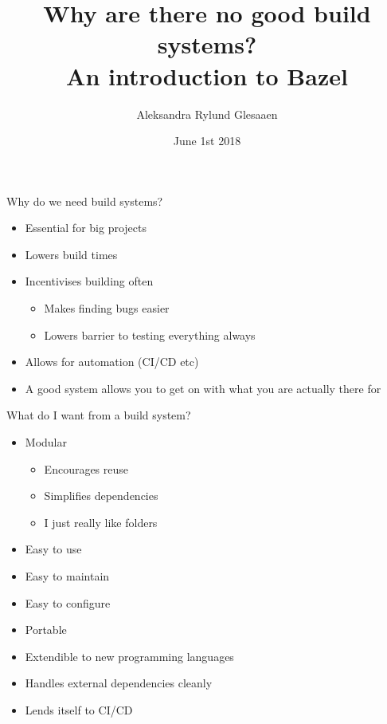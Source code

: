 \documentclass[11pt]{beamer}
\author{Aleksandra Rylund Glesaaen}
\title[%
Why are there no good build systems? An introduction to Bazel]{%
Why are there no good build systems? \\ An introduction to Bazel}
\date{June 1st 2018}
\institute{SA2C Tech Chat}
\begin{document}
\maketitle

\begin{frame}{Why do we need build systems?}

  \begin{itemize} \setlength\itemsep{1em}
    \item Essential for big projects
    \item Lowers build times
    \item Incentivises building often
    \begin{itemize}
      \item Makes finding bugs easier
      \item Lowers barrier to testing everything always
    \end{itemize}
  \item Allows for automation (CI/CD etc)
  \item A good system allows you to get on with what you are actually there for
  \end{itemize}

\end{frame}

\begin{frame}{What do I want from a build system?}

  \begin{itemize}
    \item Modular
      \begin{itemize}
        \item Encourages reuse
        \item Simplifies dependencies
        \item I just really like folders
      \end{itemize}
    \item Easy to use
    \item Easy to maintain
    \item Easy to configure
    \item Portable
    \item Extendible to new programming languages
    \item Handles external dependencies cleanly
    \item Lends itself to CI/CD
  \end{itemize}

\end{frame}
\end{document}

